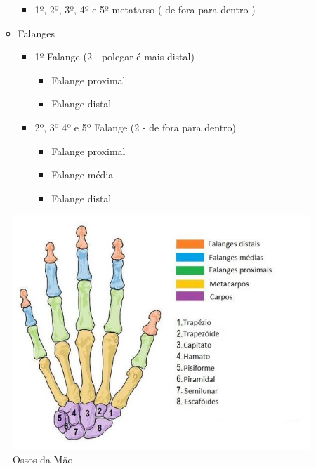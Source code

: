 \documentclass[
]{book}
\providecommand{\tightlist}{%
  \setlength{\itemsep}{0pt}\setlength{\parskip}{0pt}}
\begin{document}
\begin{itemize}
\begin{itemize}
    \begin{itemize}
    \tightlist
    \item
      1º, 2º, 3º, 4º e 5º metatarso ( de fora para dentro )
    \end{itemize}
  \item
    Falanges

    \begin{itemize}
    \tightlist
    \item
      1º Falange (2 - polegar é mais distal)

      \begin{itemize}
      \tightlist
      \item
        Falange proximal
      \item
        Falange distal
      \end{itemize}
    \item
      2º, 3º 4º e 5º Falange (2 - de fora para dentro)

      \begin{itemize}
      \tightlist
      \item
        Falange proximal
      \item
        Falange média
      \item
        Falange distal
      \end{itemize}
    \end{itemize}
  \end{itemize}
\end{itemize}

\begin{figure}

{\centering \includegraphics[width=0.9\linewidth]{figuras/Aula4-2-ossos-da-mao} 

}

\caption{Ossos da Mão}\label{fig:unnamed-chunk-5}
\end{figure}
\end{document}
